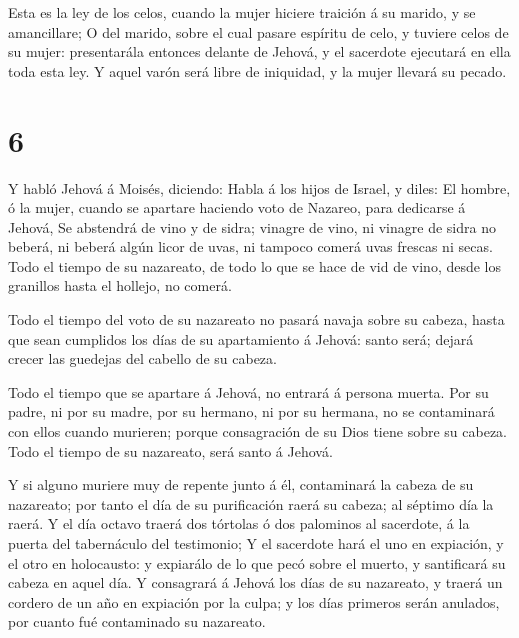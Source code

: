  Esta es la ley de los celos, cuando la mujer hiciere
traición á su marido, y se amancillare;  O del marido,
sobre el cual pasare espíritu de celo, y tuviere celos de su mujer:
presentarála entonces delante de Jehová, y el sacerdote ejecutará en
ella toda esta ley.  Y aquel varón será libre de iniquidad,
y la mujer llevará su pecado.

\hypertarget{section-5}{%
\section{6}\label{section-5}}

 Y habló Jehová á Moisés, diciendo:  Habla á los
hijos de Israel, y diles: El hombre, ó la mujer, cuando se apartare
haciendo voto de Nazareo, para dedicarse á Jehová,  Se
abstendrá de vino y de sidra; vinagre de vino, ni vinagre de sidra no
beberá, ni beberá algún licor de uvas, ni tampoco comerá uvas frescas ni
secas.  Todo el tiempo de su nazareato, de todo lo que se
hace de vid de vino, desde los granillos hasta el hollejo, no comerá.

 Todo el tiempo del voto de su nazareato no pasará navaja
sobre su cabeza, hasta que sean cumplidos los días de su apartamiento á
Jehová: santo será; dejará crecer las guedejas del cabello de su cabeza.

 Todo el tiempo que se apartare á Jehová, no entrará á
persona muerta.  Por su padre, ni por su madre, por su
hermano, ni por su hermana, no se contaminará con ellos cuando murieren;
porque consagración de su Dios tiene sobre su cabeza.  Todo
el tiempo de su nazareato, será santo á Jehová.

 Y si alguno muriere muy de repente junto á él, contaminará
la cabeza de su nazareato; por tanto el día de su purificación raerá su
cabeza; al séptimo día la raerá.  Y el día octavo traerá
dos tórtolas ó dos palominos al sacerdote, á la puerta del tabernáculo
del testimonio;  Y el sacerdote hará el uno en expiación, y
el otro en holocausto: y expiarálo de lo que pecó sobre el muerto, y
santificará su cabeza en aquel día.  Y consagrará á Jehová
los días de su nazareato, y traerá un cordero de un año en expiación por
la culpa; y los días primeros serán anulados, por cuanto fué contaminado
su nazareato.

